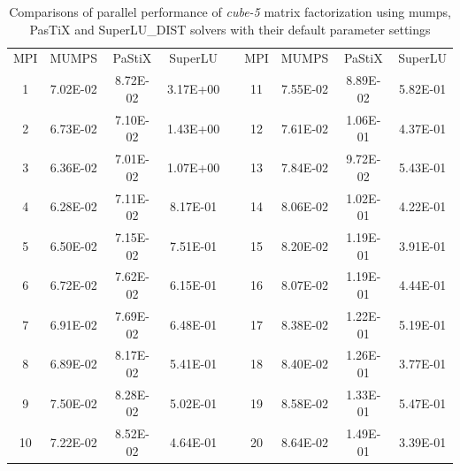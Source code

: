 \begin{table}[ht]
\centering
\begin{tabular}{|c|c|c|c|l|c|c|c|c|}
\cline{1-4} \cline{6-9}
MPI & MUMPS    & PaStiX   & SuperLU  &  & MPI & MUMPS    & PaStiX   & SuperLU  \\ \cline{1-4} \cline{6-9} 
1   & 7.02E-02 & 8.72E-02 & 3.17E+00 &  & 11  & 7.55E-02 & 8.89E-02 & 5.82E-01 \\ \cline{1-4} \cline{6-9} 
2   & 6.73E-02 & 7.10E-02 & 1.43E+00 &  & 12  & 7.61E-02 & 1.06E-01 & 4.37E-01 \\ \cline{1-4} \cline{6-9} 
3   & 6.36E-02 & 7.01E-02 & 1.07E+00 &  & 13  & 7.84E-02 & 9.72E-02 & 5.43E-01 \\ \cline{1-4} \cline{6-9} 
4   & 6.28E-02 & 7.11E-02 & 8.17E-01 &  & 14  & 8.06E-02 & 1.02E-01 & 4.22E-01 \\ \cline{1-4} \cline{6-9} 
5   & 6.50E-02 & 7.15E-02 & 7.51E-01 &  & 15  & 8.20E-02 & 1.19E-01 & 3.91E-01 \\ \cline{1-4} \cline{6-9} 
6   & 6.72E-02 & 7.62E-02 & 6.15E-01 &  & 16  & 8.07E-02 & 1.19E-01 & 4.44E-01 \\ \cline{1-4} \cline{6-9} 
7   & 6.91E-02 & 7.69E-02 & 6.48E-01 &  & 17  & 8.38E-02 & 1.22E-01 & 5.19E-01 \\ \cline{1-4} \cline{6-9} 
8   & 6.89E-02 & 8.17E-02 & 5.41E-01 &  & 18  & 8.40E-02 & 1.26E-01 & 3.77E-01 \\ \cline{1-4} \cline{6-9} 
9   & 7.50E-02 & 8.28E-02 & 5.02E-01 &  & 19  & 8.58E-02 & 1.33E-01 & 5.47E-01 \\ \cline{1-4} \cline{6-9} 
10  & 7.22E-02 & 8.52E-02 & 4.64E-01 &  & 20  & 8.64E-02 & 1.49E-01 & 3.39E-01 \\ \cline{1-4} \cline{6-9} 
\end{tabular}
\caption{Comparisons of parallel performance of  \textit{cube-5} matrix factorization using \acrshort{mumps}, PasTiX and SuperLU\_DIST solvers with their default parameter settings}
\label{table:lc-cube-5-result}
\end{table}



